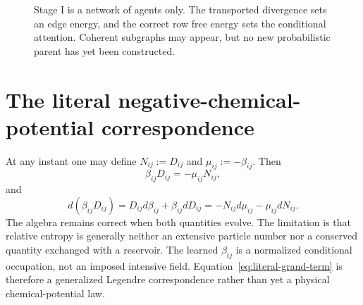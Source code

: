 \documentclass[11pt,letterpaper]{article}
\begin{document}
\begin{figure}[t]
\centering
{}
\caption{Stage I is a network of agents only.  The transported divergence sets an edge energy, and the correct row free energy sets the conditional attention.  Coherent subgraphs may appear, but no new probabilistic parent has yet been constructed.}
\label{fig:fine-agent-network}
\end{figure}

\section{The literal negative-chemical-potential correspondence}

At any instant one may define $N_{ij}:=D_{ij}$ and $\mu_{ij}:=-\beta_{ij}$.  Then
\begin{equation}
 \beta_{ij}D_{ij}=-\mu_{ij}N_{ij},
 \label{eq:literal-grand-term}
\end{equation}
and
\begin{equation}
 d(\beta_{ij}D_{ij})
 =D_{ij}d\beta_{ij}+\beta_{ij}dD_{ij}
 =-N_{ij}d\mu_{ij}-\mu_{ij}dN_{ij}.
 \label{eq:literal-differential}
\end{equation}
The algebra remains correct when both quantities evolve.  The limitation is that relative entropy is generally neither an extensive particle number nor a conserved quantity exchanged with a reservoir.  The learned $\beta_{ij}$ is a normalized conditional occupation, not an imposed intensive field.  Equation~\eqref{eq:literal-grand-term} is therefore a generalized Legendre correspondence rather than yet a physical chemical-potential law.
\end{document}
